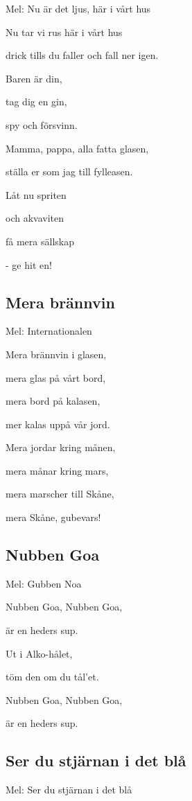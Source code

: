Mel: Nu är det ljus, här i vårt hus\bigskip

Nu tar vi rus här i vårt hus

drick tills du faller och fall ner igen.

Baren är din,

tag dig en gin,

spy och försvinn.

Mamma, pappa, alla fatta glasen,

ställa er som jag till fylleasen.

Låt nu spriten

och akvaviten

få mera sällskap

- ge hit en!

\subsection{\textbf{Mera brännvin}}

Mel: Internationalen\bigskip


Mera brännvin i glasen,

mera glas på vårt bord,

mera bord på kalasen,

mer kalas uppå vår jord.

Mera jordar kring månen,

mera månar kring mars,

mera marscher till Skåne,

mera Skåne, gubevars!

\subsection{\textbf{Nubben Goa}}

Mel: Gubben Noa\bigskip

Nubben Goa, Nubben Goa,

är en heders sup.

Ut i Alko-hålet,

töm den om du tål’et.

Nubben Goa, Nubben Goa,

är en heders sup.

\subsection{\textbf{Ser du stjärnan i det blå}}

Mel: Ser du stjärnan i det blå\bigskip

